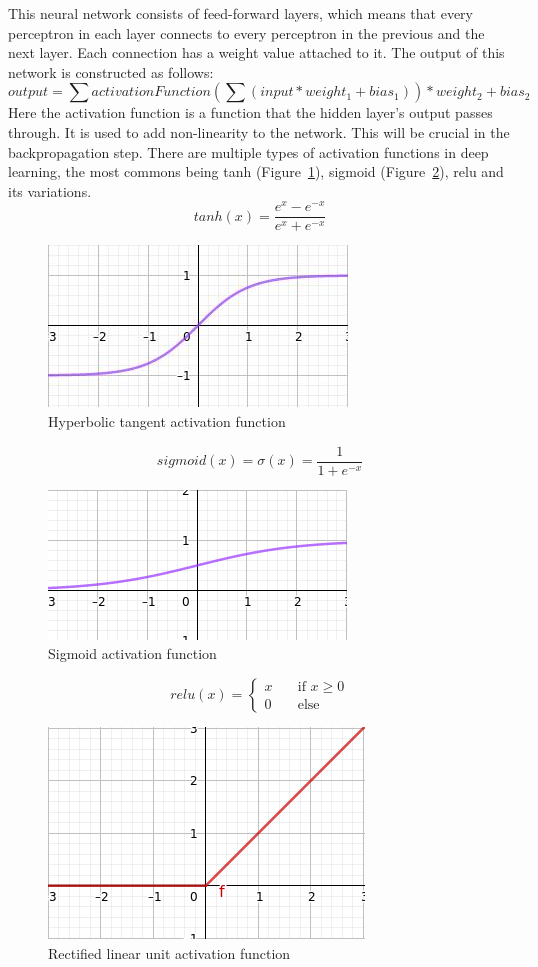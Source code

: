 This neural network consists of feed-forward layers, which means that every perceptron in each layer connects to every perceptron in the previous and the next layer. Each connection has a weight value attached to it. The output of this network is constructed as follows:
\[output = \sum activationFunction(\sum(input * weight_1 + bias_1)) * weight_2 + bias_2\]
Here the activation function is a function that the hidden layer's output passes through. It is used to add non-linearity to the network. This will be crucial in the backpropagation step.
There are multiple types of activation functions in deep learning, the most commons being tanh (Figure~\ref{fig:tanh}), sigmoid (Figure~\ref{fig:sigmoid}), relu and its variations.
\[tanh(x) = \frac{e^x - e^{-x}}{e^x + e^{-x}}\]
\begin{figure}[!htb]
	\centering
	\includegraphics[scale=0.5]{tanh.jpg}
	\caption{Hyperbolic tangent activation function}
	\label{fig:tanh}
\end{figure}
\[sigmoid(x) = \sigma(x) = \frac{1}{1 + e^{-x}}\]
\begin{figure}[!htb]
	\centering
	\includegraphics[scale=0.5]{sigmoid.jpg}
	\caption{Sigmoid activation function}
	\label{fig:sigmoid}
\end{figure}
\[relu(x) = \begin{cases}x & \quad \text{if } x \geq 0 \\ 0 & \quad \text{else}\end{cases}\]
\begin{figure}[!htb]
	\centering
	\includegraphics[scale=0.5]{relu.jpg}
	\caption{Rectified linear unit activation function}
	\label{fig:relu}
\end{figure}
